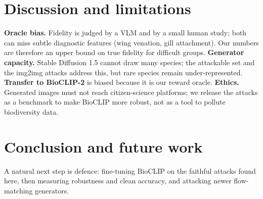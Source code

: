 \section{Discussion and limitations}
\textbf{Oracle bias.} Fidelity is judged by a VLM and by a small human study; both can miss subtle diagnostic
features (wing venation, gill attachment). Our numbers are therefore an upper bound on true fidelity for difficult
groups. \textbf{Generator capacity.} Stable Diffusion 1.5 cannot draw many species; the attackable set and the
img2img attacks address this, but rare species remain under-represented. \textbf{Transfer to BioCLIP-2} is biased
because it is our reward oracle. \textbf{Ethics.} Generated images must not reach citizen-science platforms; we
release the attacks as a benchmark to make BioCLIP more robust, not as a tool to pollute biodiversity data.

\section{Conclusion and future work}
 A natural next step is defence: fine-tuning BioCLIP on the faithful attacks
found here, then measuring robustness and clean accuracy, and attacking newer flow-matching generators.
